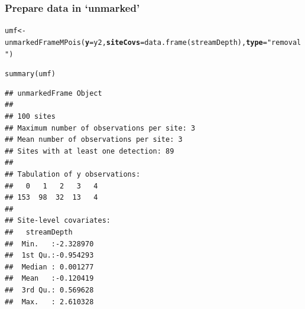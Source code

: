 \documentclass[color=usenames,dvipsnames]{beamer}\usepackage[]{graphicx}\usepackage[]{xcolor}
\makeatletter
\newcommand{\hlstr}[1]{\textcolor[rgb]{0.749,0.012,0.012}{#1}}%
\newcommand{\hlstd}[1]{\textcolor[rgb]{0,0,0}{#1}}%
\newcommand{\hlkwb}[1]{\textcolor[rgb]{0,0.341,0.682}{#1}}%
\newcommand{\hlkwc}[1]{\textcolor[rgb]{0,0,0}{\textbf{#1}}}%
\newcommand{\hlkwd}[1]{\textcolor[rgb]{0.004,0.004,0.506}{#1}}%
\newenvironment{kframe}{%
 \def\at@end@of@kframe{}%
 \ifinner\ifhmode%
  \def\at@end@of@kframe{\end{minipage}}%
  \begin{minipage}{\columnwidth}%
 \fi\fi%
 \def\FrameCommand##1{\hskip\@totalleftmargin \hskip-\fboxsep
 \colorbox{shadecolor}{##1}\hskip-\fboxsep
     \hskip-\linewidth \hskip-\@totalleftmargin \hskip\columnwidth}%
 \MakeFramed {\advance\hsize-\width
   \@totalleftmargin\z@ \linewidth\hsize
   \@setminipage}}%
 {\par\unskip\endMakeFramed%
 \at@end@of@kframe}
\newenvironment{knitrout}{}{} %
\makeatother
\begin{document}









\begin{frame}[fragile]
  \frametitle{Prepare data in `unmarked'}
  \small
\begin{knitrout}\tiny
{}\color{fgcolor}\begin{kframe}
\begin{alltt}
\hlstd{umf} \hlkwb{<-} \hlkwd{unmarkedFrameMPois}\hlstd{(}\hlkwc{y}\hlstd{=y2,} \hlkwc{siteCovs}\hlstd{=}\hlkwd{data.frame}\hlstd{(streamDepth),} \hlkwc{type}\hlstd{=}\hlstr{"removal"}\hlstd{)}
\end{alltt}
\end{kframe}
\end{knitrout}
\pause
\begin{knitrout}\scriptsize
{}\color{fgcolor}\begin{kframe}
\begin{alltt}
\hlkwd{summary}\hlstd{(umf)}
\end{alltt}
\begin{verbatim}
## unmarkedFrame Object
## 
## 100 sites
## Maximum number of observations per site: 3 
## Mean number of observations per site: 3 
## Sites with at least one detection: 89 
## 
## Tabulation of y observations:
##   0   1   2   3   4 
## 153  98  32  13   4 
## 
## Site-level covariates:
##   streamDepth       
##  Min.   :-2.328970  
##  1st Qu.:-0.954293  
##  Median : 0.001277  
##  Mean   :-0.120419  
##  3rd Qu.: 0.569628  
##  Max.   : 2.610328
\end{verbatim}
\end{kframe}
\end{knitrout}
\end{frame}



\end{document}
